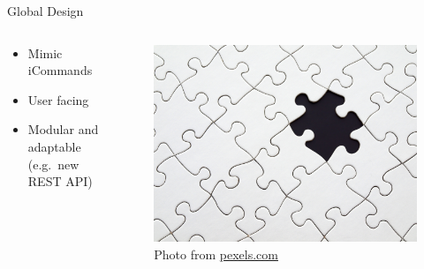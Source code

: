 \documentclass[
  ignorenonframetext,
]{beamer}
\providecommand{\tightlist}{%
  \setlength{\itemsep}{0pt}\setlength{\parskip}{0pt}}\usepackage{longtable,booktabs,array}
\begin{document}
\begin{frame}{Global Design}
\protect\hypertarget{global-design}{}
\begin{columns}[T]
\begin{column}{0.5\textwidth}
\begin{itemize}
\tightlist
\item
  Mimic iCommands
\item
  User facing
\item
  Modular and adaptable (e.g.~new REST API)
\end{itemize}
\end{column}

\begin{column}{0.5\textwidth}
\begin{figure}

{\centering \includegraphics{pexels-pixabay-262488.jpg}

}

\caption{Photo from \href{https://www.pexels.com}{pexels.com}}

\end{figure}
\end{column}
\end{columns}
\end{frame}
\end{document}
